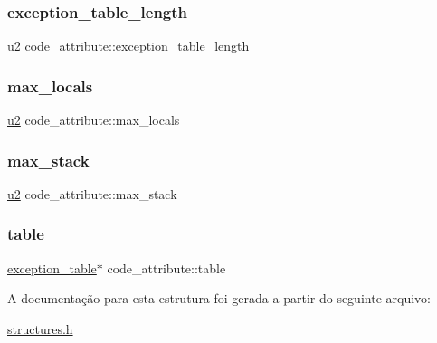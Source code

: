 \subsubsection{\texorpdfstring{exception\+\_\+table\+\_\+length}{exception\_table\_length}}
{\footnotesize\ttfamily \hyperlink{lista__operandos_8h_a732cde1300aafb73b0ea6c2558a7a54f}{u2} code\+\_\+attribute\+::exception\+\_\+table\+\_\+length}

\mbox{\label{structcode__attribute_ab75487f3c1d38f9fb6ad5e71ab99dea2}} 
\subsubsection{\texorpdfstring{max\+\_\+locals}{max\_locals}}
{\footnotesize\ttfamily \hyperlink{lista__operandos_8h_a732cde1300aafb73b0ea6c2558a7a54f}{u2} code\+\_\+attribute\+::max\+\_\+locals}

\mbox{\label{structcode__attribute_abd4d398c165a4e91f3ea559808931473}} 
\subsubsection{\texorpdfstring{max\+\_\+stack}{max\_stack}}
{\footnotesize\ttfamily \hyperlink{lista__operandos_8h_a732cde1300aafb73b0ea6c2558a7a54f}{u2} code\+\_\+attribute\+::max\+\_\+stack}

\mbox{\label{structcode__attribute_a8bdff0149755249696a5d6aa288d7a98}} 
\subsubsection{\texorpdfstring{table}{table}}
{\footnotesize\ttfamily \hyperlink{structexception__table}{exception\+\_\+table}$\ast$ code\+\_\+attribute\+::table}



A documentação para esta estrutura foi gerada a partir do seguinte arquivo\+:\begin{DoxyCompactItemize}
\item 
\hyperlink{structures_8h}{structures.\+h}\end{DoxyCompactItemize}

